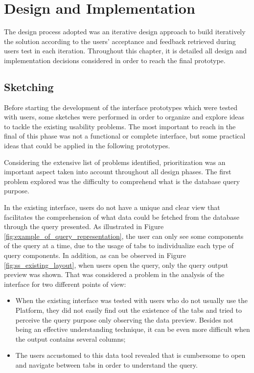 

\chapter{Design and Implementation}
\label{cha:design_and_implementation}

The design process adopted was an iterative design approach to build iteratively the solution according to the users' acceptance and feedback retrieved during users test in each iteration. Throughout this chapter, it is detailed all design and implementation decisions considered in order to reach the final prototype.

\section{Sketching}
\label{sec:sketching}

Before starting the development of the interface prototypes which were tested with users, some sketches were performed in order to organize and explore ideas to tackle the existing usability problems. The most important to reach in the final of this phase was not a functional or complete interface, but some practical ideas that could be applied in the following prototypes.

Considering the extensive list of problems identified, prioritization was an important aspect taken into account throughout all design phases. The first problem explored was the difficulty to comprehend what is the database query purpose.

In the existing interface, users do not have a unique and clear view that facilitates the comprehension of what data could be fetched from the database through the query presented. As illustrated in Figure \ref{fig:example_of_query_representation}, the user can only see some components of the query at a time, due to the usage of tabs to individualize each type of query components. In addition, as can be observed in Figure \ref{fig:ss_existing_layout}, when users open the query, only the query output preview was shown. That was considered a problem in the analysis of the interface for two different points of view:

\begin{itemize}
    \item When the existing interface was tested with users who do not usually use the Platform, they did not easily find out the existence of the tabs and tried to perceive the query purpose only observing the data preview. Besides not being an effective understanding technique, it can be even more difficult when the output contains several columns;
    \item The users accustomed to this data tool revealed that is cumbersome to open and navigate between tabs in order to understand the query.
\end{itemize}

